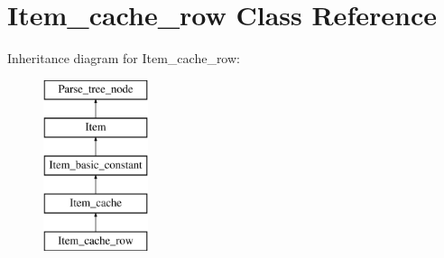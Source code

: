 \hypertarget{classItem__cache__row}{}\section{Item\+\_\+cache\+\_\+row Class Reference}
\label{classItem__cache__row}
Inheritance diagram for Item\+\_\+cache\+\_\+row\+:\begin{figure}[H]
\begin{center}
\leavevmode
\includegraphics[height=5.000000cm]{classItem__cache__row}
\end{center}
\end{figure}
